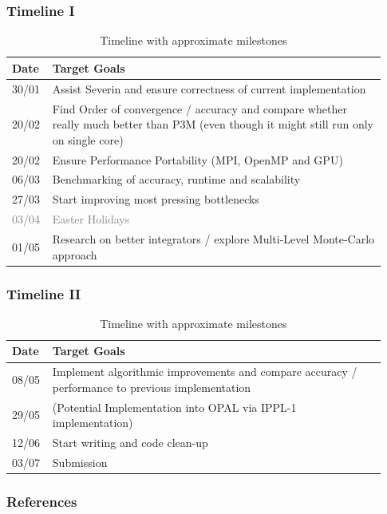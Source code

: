 \documentclass[10pt]{beamer}
\begin{document}
\begin{frame}
\frametitle{Timeline I}
\begin{table}[]
\def\arraystretch{1.5}
\begin{tabular}{p{0.08\linewidth} | p{0.85\linewidth}}
Date & Target Goals \\
\hline \hline
30/01 & Assist Severin and ensure correctness of current implementation \\
20/02 & Find Order of convergence / accuracy and compare whether really much better than P3M (even though it might still run only on single core) \\
20/02 & Ensure Performance Portability (MPI, OpenMP and GPU) \\
06/03 & Benchmarking of accuracy, runtime and scalability \\
27/03 & Start improving most pressing bottlenecks \\
\textcolor{gray}{03/04} & \textcolor{gray}{Easter Holidays} \\
01/05 & Research on better integrators / explore Multi-Level Monte-Carlo approach \\
\end{tabular}
\caption{Timeline with approximate milestones}
\end{table}

\end{frame}

\begin{frame}
\frametitle{Timeline II}

\begin{table}[]
\def\arraystretch{1.5}
\begin{tabular}{p{0.08\linewidth} | p{0.85\linewidth}}
Date & Target Goals \\
\hline \hline
08/05 & Implement algorithmic improvements and compare accuracy / performance to previous implementation \\
29/05 & (Potential Implementation into OPAL via IPPL-1 implementation) \\
12/06 & Start writing and code clean-up \\
03/07 & Submission \\
\end{tabular}
\caption{Timeline with approximate milestones}
\end{table}

\end{frame}

 \begin{frame}[allowframebreaks]
     \frametitle{References}
     
     
 \end{frame}
 
\end{document}
